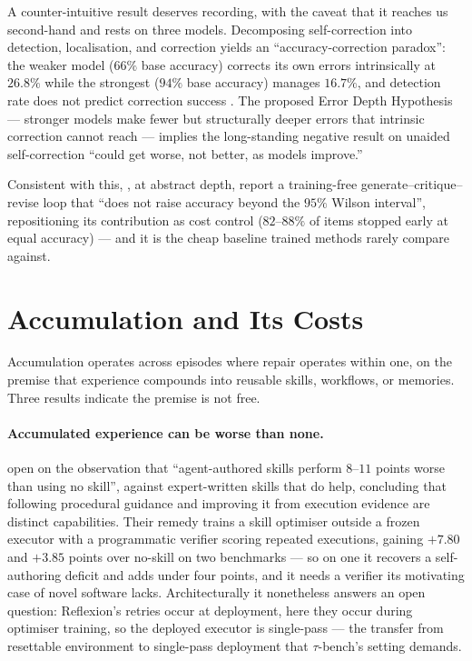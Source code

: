 \documentclass[10pt,twocolumn,a4paper]{article}
\begin{document}
A counter-intuitive result deserves recording, with the caveat that it reaches us
second-hand and rests on three models.
Decomposing self-correction into detection, localisation, and correction yields an
``accuracy-correction paradox'': the weaker model ($66\%$ base accuracy) corrects its own
errors intrinsically at $26.8\%$ while the strongest ($94\%$ base accuracy) manages
$16.7\%$, and detection rate does not predict correction success
\citep{chen2026horizongapplanningmemory}.
The proposed Error Depth Hypothesis --- stronger models make fewer but structurally deeper
errors that intrinsic correction cannot reach --- implies the long-standing negative result
on unaided self-correction ``could get worse, not better, as models improve.''

Consistent with this, \citet{yu2026trainingfreeinferencetimeselfreflectioncostbounded},
at abstract depth, report a training-free generate--critique--revise loop that ``does not
raise accuracy beyond the $95\%$ Wilson interval'', repositioning its contribution as cost
control ($82$--$88\%$ of items stopped early at equal accuracy) --- and it is the cheap
baseline trained methods rarely compare against.

\section{Accumulation and Its Costs}
\label{sec:accum}

Accumulation operates across episodes where repair operates within one, on the premise that
experience compounds into reusable skills, workflows, or memories.
Three results indicate the premise is not free.

\paragraph{Accumulated experience can be worse than none.}
\citet{peng2026writeexecuterefineskill} open on the observation that ``agent-authored
skills perform $8$--$11$ points worse than using no skill'', against expert-written skills
that do help, concluding that following procedural guidance and improving it from execution
evidence are distinct capabilities.
Their remedy trains a skill optimiser outside a frozen executor with a programmatic verifier
scoring repeated executions, gaining $+7.80$ and $+3.85$ points over no-skill on two
benchmarks --- so on one it recovers a self-authoring deficit and adds under four points,
and it needs a verifier its motivating case of novel software lacks.
Architecturally it nonetheless answers an open question: Reflexion's retries occur at
deployment, here they occur during optimiser training, so the deployed executor is
single-pass --- the transfer from resettable environment to single-pass deployment that
$\tau$-bench's setting demands.
\end{document}
